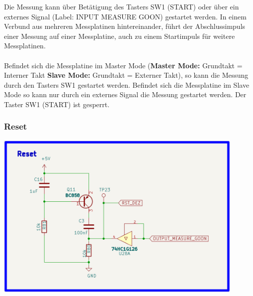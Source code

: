 Die Messung kann über Betätigung des Tasters SW1 (START) oder über ein externes Signal (Label: INPUT MEASURE GOON) gestartet werden. In einem Verbund aus mehreren Messplatinen hintereinander, führt der Abschlussimpuls einer Messung auf einer Messplatine, auch zu einem Startimpuls für weitere Messplatinen.
\\
\\ 
Befindet sich die Messplatine im \glqq Master Mode \grqq{} (\textbf{Master Mode:}  Grundtakt = Interner Takt \textbf{Slave Mode:} Grundtakt = Externer Takt), so kann die Messung durch den Tasters SW1 gestartet werden. Befindet sich die Messplatine im \glqq Slave Mode \grqq{} so kann nur durch ein externes Signal die Messung gestartet werden. Der Taster SW1 (START) ist gesperrt.

\newpage
\subsubsection{Reset}

\begin{center}
\includegraphics[width=12cm]{Bilder/Reset.png}
\end{center}


